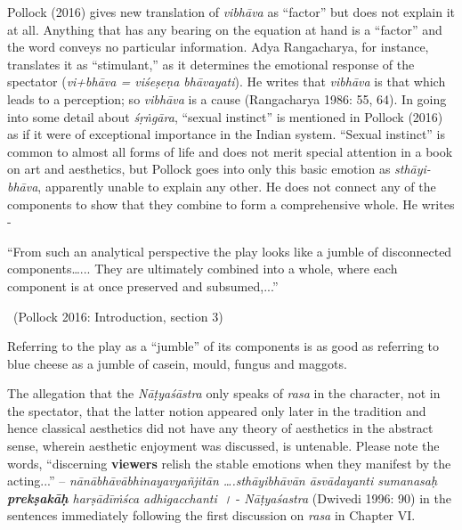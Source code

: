 Pollock (2016) gives new translation of \textit{vibhāva} as “factor” but does not explain it at all. Anything that has any bearing on the equation at hand is a “factor” and the word conveys no particular information. Adya Rangacharya, for instance, translates it as “stimulant,” as it determines the emotional response of the spectator (\textit{vi+bhāva = viśeṣeṇa bhāvayati}). He writes that \textit{vibhāva} is that which leads to a perception; so \textit{vibhāva} is a cause (Rangacharya 1986: 55, 64). In going into some detail about \textit{śṛṅgāra}, “sexual instinct” is mentioned in Pollock (2016) as if it were of exceptional importance in the Indian system. “Sexual instinct” is common to almost all forms of life and does not merit special attention in a book on art and aesthetics, but Pollock goes into only this basic emotion as \textit{sthāyi-bhāva}, apparently unable to explain any other. He does not connect any of the components to show that they combine to form a comprehensive whole. He writes -

\begin{myquote}
“From such an analytical perspective the play looks like a jumble of disconnected components…... They are ultimately combined into a whole, where each component is at once preserved and subsumed,...” 

~\hfill (Pollock 2016: Introduction, section 3)
\end{myquote}

Referring to the play as a “jumble” of its components is as good as referring to blue cheese as a jumble of casein, mould, fungus and maggots.

The allegation that the \textit{Nāṭyaśāstra} only speaks of \textit{rasa} in the character, not in the spectator, that the latter notion appeared only later in the tradition and hence classical aesthetics did not have any theory of aesthetics in the abstract sense, wherein aesthetic enjoyment was discussed, is untenable. Please note the words, “discerning \textbf{viewers} relish the stable emotions when they manifest by the acting...” -- \textit{nānābhāvābhinayavyañjitān ….sthāyibhāvān āsvādayanti sumanasaḥ \textbf{prekṣakāḥ} harṣādīṁśca adhigacchanti~{\dev ।}} - \textit{Nāṭyaśastra} (Dwivedi 1996: 90) in the sentences immediately following the first discussion on \textit{rasa }in Chapter VI.

